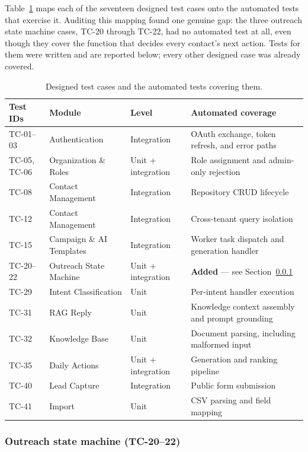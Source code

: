 \documentclass[a4paper]{article}
\begin{document}
Table~\ref{tab:tc-results} maps each of the seventeen designed test cases onto
the automated tests that exercise it. Auditing this mapping found one genuine
gap: the three outreach state machine cases, TC-20 through TC-22, had no
automated test at all, even though they cover the function that decides every
contact's next action. Tests for them were written and are reported below;
every other designed case was already covered.

\begin{table}[H]
\centering
\caption{Designed test cases and the automated tests covering them.}
\label{tab:tc-results}
\small
\begin{tabular}{|p{2.1cm}|p{3.5cm}|p{2.1cm}|p{4.6cm}|}
\hline
\textbf{Test IDs} & \textbf{Module} & \textbf{Level} &
\textbf{Automated coverage} \\
\hline
TC-01--03 & Authentication & Integration & OAuth exchange, token refresh, and
error paths \\
\hline
TC-05, TC-06 & Organization \& Roles & Unit + integration & Role assignment and
admin-only rejection \\
\hline
TC-08 & Contact Management & Integration & Repository CRUD lifecycle \\
\hline
TC-12 & Contact Management & Integration & Cross-tenant query isolation \\
\hline
TC-15 & Campaign \& AI Templates & Integration & Worker task dispatch and
generation handler \\
\hline
TC-20--22 & Outreach State Machine & Unit + integration & \textbf{Added} ---
see Section~\ref{sec:state-machine-tests} \\
\hline
TC-29 & Intent Classification & Unit & Per-intent handler execution \\
\hline
TC-31 & RAG Reply & Unit & Knowledge context assembly and prompt grounding \\
\hline
TC-32 & Knowledge Base & Unit & Document parsing, including malformed input \\
\hline
TC-35 & Daily Actions & Unit + integration & Generation and ranking pipeline \\
\hline
TC-40 & Lead Capture & Integration & Public form submission \\
\hline
TC-41 & Import & Unit & CSV parsing and field mapping \\
\hline
\end{tabular}
\end{table}

\subsubsection{Outreach state machine (TC-20--22)}
\label{sec:state-machine-tests}
\end{document}
